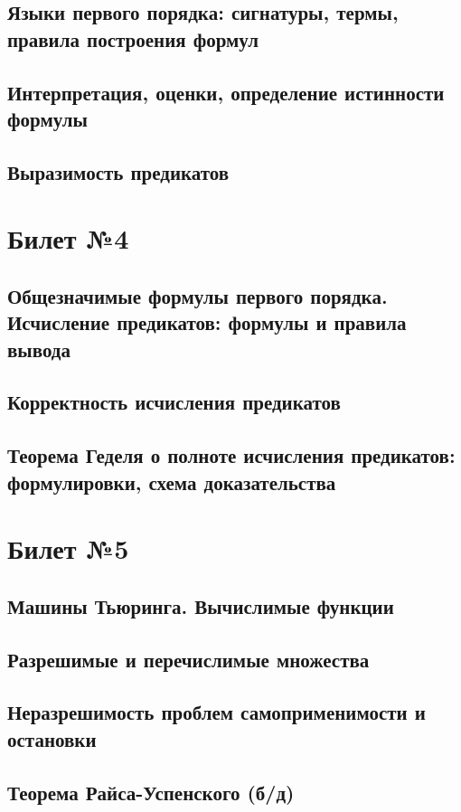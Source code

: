 \documentclass[a4paper]{article}
\begin{document}
\subsection{Языки первого порядка: сигнатуры, термы, правила построения формул}
\subsection{Интерпретация, оценки, определение истинности формулы}
\subsection{Выразимость предикатов}

\section{Билет №4}
\subsection{Общезначимые формулы первого порядка. Исчисление предикатов: формулы и правила вывода}
\subsection{Корректность исчисления предикатов}
\subsection{Теорема Геделя о полноте исчисления предикатов: формулировки, схема доказательства}

\section{Билет №5}
\subsection{Машины Тьюринга. Вычислимые функции}
\subsection{Разрешимые и перечислимые множества}
\subsection{Неразрешимость проблем самоприменимости и остановки}
\subsection{Теорема Райса-Успенского (б/д)}
\end{document}
